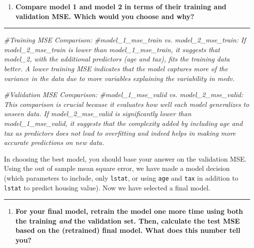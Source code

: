 \documentclass[
  12pt,
]{article}
\newenvironment{Shaded}{\begin{snugshade}}{\end{snugshade}}
\newcommand{\CommentTok}[1]{\textcolor[rgb]{0.56,0.35,0.01}{\textit{#1}}}
\providecommand{\tightlist}{%
  \setlength{\itemsep}{0pt}\setlength{\parskip}{0pt}}
\begin{document}
\begin{enumerate}
\def\labelenumi{\arabic{enumi}.}
\setcounter{enumi}{15}
\tightlist
\item
  \textbf{Compare model 1 and model 2 in terms of their training and
  validation MSE. Which would you choose and why?}
\end{enumerate}

\begin{center}\rule{0.5\linewidth}{0.5pt}\end{center}

\begin{Shaded}
\begin{Highlighting}[]
\CommentTok{\#Training MSE Comparison:}
\CommentTok{\#model\_1\_mse\_train vs. model\_2\_mse\_train: If model\_2\_mse\_train is lower than model\_1\_mse\_train, it suggests that model\_2, with the additional predictors (age and tax), fits the training data better. A lower training MSE indicates that the model captures more of the variance in the data due to more variables explaining the variability in medv.}

\CommentTok{\#Validation MSE Comparison:}
\CommentTok{\#model\_1\_mse\_valid vs. model\_2\_mse\_valid: This comparison is crucial because it evaluates how well each model generalizes to unseen data. If model\_2\_mse\_valid is significantly lower than model\_1\_mse\_valid, it suggests that the complexity added by including age and tax as predictors does not lead to overfitting and indeed helps in making more accurate predictions on new data.}
\end{Highlighting}
\end{Shaded}

In choosing the best model, you should base your answer on the
validation MSE. Using the out of sample mean square error, we have made
a model decision (which parameters to include, only \texttt{lstat}, or
using \texttt{age} and \texttt{tax} in addition to \texttt{lstat} to
predict housing value). Now we have selected a final model.

\begin{center}\rule{0.5\linewidth}{0.5pt}\end{center}

\begin{enumerate}
\def\labelenumi{\arabic{enumi}.}
\setcounter{enumi}{16}
\tightlist
\item
  \textbf{For your final model, retrain the model one more time using
  both the training \emph{and} the validation set. Then, calculate the
  test MSE based on the (retrained) final model. What does this number
  tell you?}
\end{enumerate}
\end{document}
